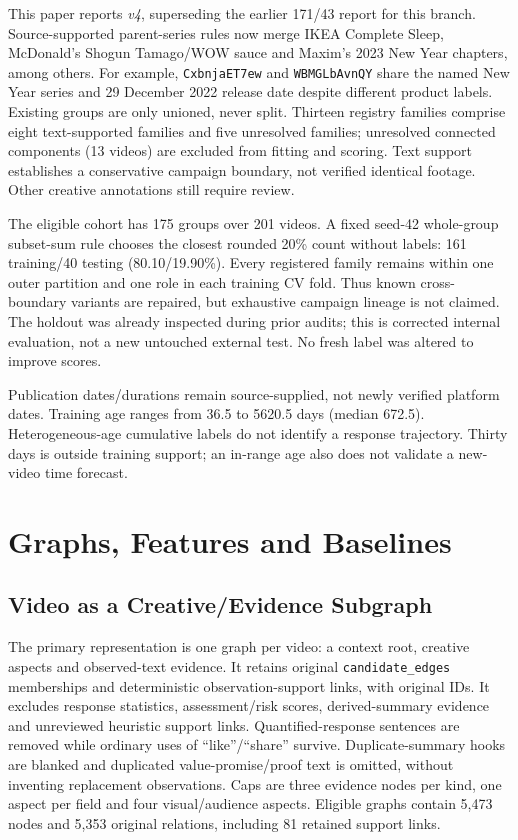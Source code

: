 \documentclass[a4paper,conference]{IEEEtran}
\begin{document}
This paper reports \emph{v4}, superseding the earlier 171/43 report for this branch. Source-supported parent-series rules now merge IKEA Complete Sleep, McDonald's Shogun Tamago/WOW sauce and Maxim's 2023 New Year chapters, among others. For example, \texttt{CxbnjaET7ew} and \texttt{WBMGLbAvnQY} share the named New Year series and 29 December 2022 release date despite different product labels. Existing groups are only unioned, never split. Thirteen registry families comprise eight text-supported families and five unresolved families; unresolved connected components (13 videos) are excluded from fitting and scoring. Text support establishes a conservative campaign boundary, not verified identical footage. Other creative annotations still require review.

The eligible cohort has 175 groups over 201 videos. A fixed seed-42 whole-group subset-sum rule chooses the closest rounded 20\% count without labels: 161 training/40 testing (80.10/19.90\%). Every registered family remains within one outer partition and one role in each training CV fold. Thus known cross-boundary variants are repaired, but exhaustive campaign lineage is not claimed. The holdout was already inspected during prior audits; this is corrected internal evaluation, not a new untouched external test. No fresh label was altered to improve scores.

Publication dates/durations remain source-supplied, not newly verified platform dates. Training age ranges from 36.5 to 5620.5 days (median 672.5). Heterogeneous-age cumulative labels do not identify a response trajectory. Thirty days is outside training support; an in-range age also does not validate a new-video time forecast.

\section{Graphs, Features and Baselines}
\subsection{Video as a Creative/Evidence Subgraph}
The primary representation is one graph per video: a context root, creative aspects and observed-text evidence. It retains original \texttt{candidate\_edges} memberships and deterministic observation-support links, with original IDs. It excludes response statistics, assessment/risk scores, derived-summary evidence and unreviewed heuristic support links. Quantified-response sentences are removed while ordinary uses of ``like''/``share'' survive. Duplicate-summary hooks are blanked and duplicated value-promise/proof text is omitted, without inventing replacement observations. Caps are three evidence nodes per kind, one aspect per field and four visual/audience aspects. Eligible graphs contain 5,473 nodes and 5,353 original relations, including 81 retained support links.
\end{document}
